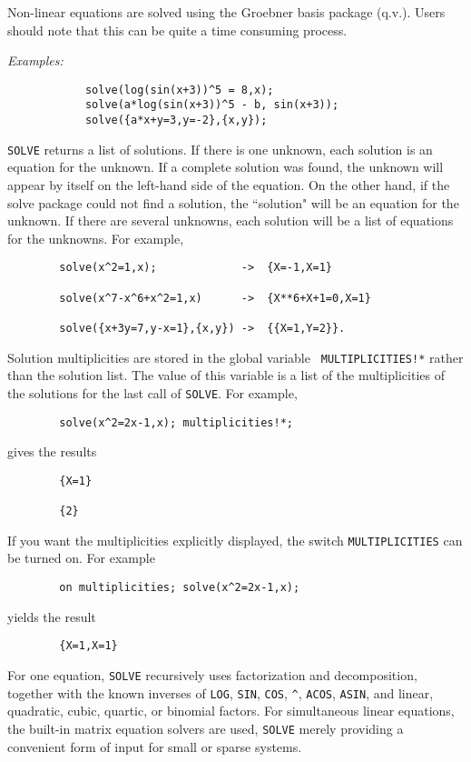 Non-linear equations are solved using the Groebner basis package (q.v.).
 Users should note that this can be quite a
time consuming process.

{\it Examples:}
\begin{verbatim}
            solve(log(sin(x+3))^5 = 8,x);
            solve(a*log(sin(x+3))^5 - b, sin(x+3));
            solve({a*x+y=3,y=-2},{x,y});
\end{verbatim}

{\tt SOLVE} returns a list of solutions.  If there is one unknown, each
solution is an equation for the unknown.  If a complete solution was
found, the unknown will appear by itself on the left-hand side of the
equation.  On the other hand, if the solve package could not find a
solution, the ``solution" will be an equation for the unknown.  If there
are several unknowns, each solution will be a list of equations for the
unknowns.  For example,
\begin{verbatim}
        solve(x^2=1,x);             ->  {X=-1,X=1}

        solve(x^7-x^6+x^2=1,x)      ->  {X**6+X+1=0,X=1}

        solve({x+3y=7,y-x=1},{x,y}) ->  {{X=1,Y=2}}.
\end{verbatim}
Solution multiplicities are stored in the global variable {\tt
MULTIPLICITIES!*} rather than the solution list.  The value of this
variable is a list of the multiplicities of the solutions for the last
call of {\tt SOLVE}.   For example,
\begin{verbatim}
        solve(x^2=2x-1,x); multiplicities!*;
\end{verbatim}
gives the results
\begin{verbatim}
        {X=1}

        {2}
\end{verbatim}

If you want the multiplicities explicitly displayed, the switch
{\tt MULTIPLICITIES}  can be turned on. For example
\begin{verbatim}
        on multiplicities; solve(x^2=2x-1,x);
\end{verbatim}
yields the result
\begin{verbatim}
        {X=1,X=1}
\end{verbatim}

For one equation, {\tt SOLVE}  recursively uses
factorization and decomposition, together with the known inverses of
{\tt LOG}, {\tt SIN}, {\tt COS}, {\tt \^{ }}, {\tt ACOS}, {\tt ASIN}, and
linear, quadratic, cubic, quartic, or binomial factors.  For
simultaneous linear equations, the built-in matrix equation solvers are
used, {\tt SOLVE} merely providing a convenient form of input for small
or sparse systems.

